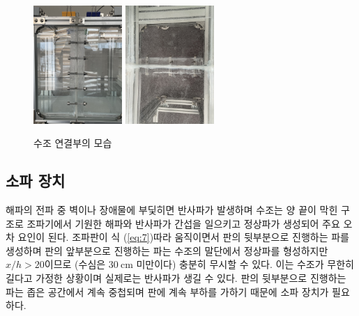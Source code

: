 \begin{figure}[H]
	\begin{center}
		\includegraphics[width=0.3\textwidth]{images/magam1.jpg}
		\includegraphics[width=0.3\textwidth]{images/magam2.jpg}
		\caption{수조 연결부의 모습}
		\label{Waveabsorber}
	\end{center}
\end{figure}

\subsection{소파 장치}
해파의 전파 중 벽이나 장애물에 부딫히면 반사파가 발생하며 수조는 양 끝이 막힌 구조로 조파기에서 기원한 해파와 반사파가 간섭을 일으키고 정상파가 생성되어 주요 오차 요인이 된다. 조파판이 식 (\ref{eq:7})\을 따라 움직이면서 판의 뒷부분으로 진행하는 파를 생성하며 판의 앞부분으로 진행하는 파는 수조의 말단에서 정상파를 형성하지만 $x/h > 20$이므로 (수심은 $30\mathrm{~cm}$ 미만이다) 충분히 무시할 수 있다. 이는 수조가 무한히 길다고 가정한 상황이며 실제로는 반사파가 생길 수 있다. 판의 뒷부분으로 진행하는 파는 좁은 공간에서 계속 중첩되며 판에 계속 부하를 가하기 때문에 소파 장치가 필요하다.

